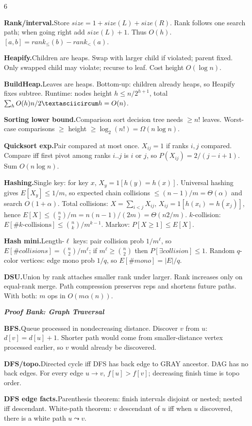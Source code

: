 \documentclass[a4paper,landscape]{article}
\newcommand{\subsectionsize}{\fontsize{3.92}{4.02}\selectfont}
\newcommand{\proofbanktitle}[1]{%
  \par\vspace{0pt}%
  {\subsectionsize\bfseries\itshape\color{rustKeyword} #1}\par%
  \vspace{0pt}%
}
\newcommand{\proofitem}[2]{%
  \par\vspace{0pt}%
  \noindent\hangindent=0.42cm\hangafter=1%
  {\bfseries\color{rustFunction} #1.}\hspace{0.055cm}#2\par%
}
\begin{document}
\begin{multicols*}{6}
\proofitem{Rank/interval}{Store $size=1+size(L)+size(R)$. Rank follows one search path; when going right add $size(L)+1$. Thus $O(h)$. $[a,b]=rank_{\le}(b)-rank_{<}(a)$.}

\proofitem{Heapify}{Children are heaps. Swap with larger child if violated; parent fixed. Only swapped child may violate; recurse to leaf. Cost height $O(\log n)$.}

\proofitem{BuildHeap}{Leaves are heaps. Bottom-up: children already heaps, so Heapify fixes subtree. Runtime: nodes height $h\le n/2^{h+1}$, total $\sum_h O(h)n/2\textasciicircum h=O(n)$.}

\proofitem{Sorting lower bound}{Comparison sort decision tree needs $\ge n!$ leaves. Worst-case comparisons $\ge$ height $\ge\log_2(n!)=\Omega(n\log n)$.}

\proofitem{Quicksort exp}{Pair compared at most once. $X_{ij}=1$ if ranks $i,j$ compared. Compare iff first pivot among ranks $i..j$ is $i$ or $j$, so $P(X_{ij})=2/(j-i+1)$. Sum $O(n\log n)$.}

\proofitem{Hashing}{Single key: for key $x$, $X_y=1[h(y)=h(x)]$. Universal hashing gives $E[X_y]\le1/m$, so expected chain collisions $\le(n-1)/m=\Theta(\alpha)$ and search $O(1+\alpha)$. Total collisions: $X=\sum_{i<j}X_{ij}$, $X_{ij}=1[h(x_i)=h(x_j)]$, hence $E[X]\le{n\choose2}/m=n(n-1)/(2m)=\Theta(n2/m)$. $k$-collision: $E[\#k\text{-collisions}]\le {n\choose k}/m^{k-1}$. Markov: $P[X\ge1]\le E[X]$.}
\proofitem{Hash mini}{Length-$\ell$ keys: pair collision prob $1/m^\ell$, so $E[\#collisions]={n\choose2}/m^\ell$; if $m^\ell\ge{n\choose2}$ then $P[\exists collision]\le1$. Random $q$-color vertices: edge mono prob $1/q$, so $E[\#mono]=|E|/q$.}
\proofitem{DSU}{Union by rank attaches smaller rank under larger. Rank increases only on equal-rank merge. Path compression preserves reps and shortens future paths. With both: $m$ ops in $O(m\alpha(n))$.}

\proofbanktitle{Proof Bank: Graph Traversal}
\proofitem{BFS}{Queue processed in nondecreasing distance. Discover $v$ from $u$: $d[v]=d[u]+1$. Shorter path would come from smaller-distance vertex processed earlier, so $v$ would already be discovered.}

\proofitem{DFS/topo}{Directed cycle iff DFS has back edge to GRAY ancestor. DAG has no back edges. For every edge $u\to v$, $f[u]>f[v]$; decreasing finish time is topo order.}

\proofitem{DFS edge facts}{Parenthesis theorem: finish intervals disjoint or nested; nested iff descendant. White-path theorem: $v$ descendant of $u$ iff when $u$ discovered, there is a white path $u\leadsto v$.}


\end{multicols*}
\end{document}
